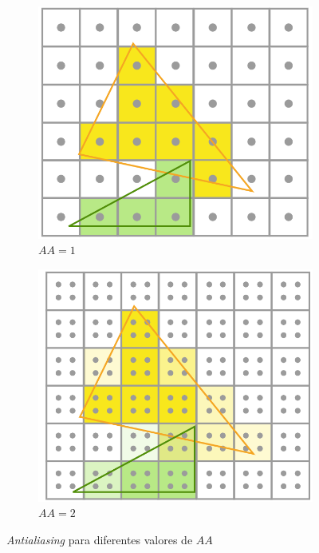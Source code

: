 \begin{figure}[!h]
    \centering
    \begin{subfigure}[b]{0.4\textwidth}
        \centering
        \includegraphics[width=\textwidth]{Plantilla-TFG-master/img/grid1.png}
        \caption{$AA = 1$}
    \end{subfigure}
    \hspace{15pt}
    \begin{subfigure}[b]{0.4\textwidth}
        \centering
        \includegraphics[width=\textwidth]{Plantilla-TFG-master/img/grid2.png}
        \caption{$AA = 2$}
    \end{subfigure}
    \hfill
     \caption{\textit{Antialiasing} para diferentes valores de $AA$}
\end{figure}

